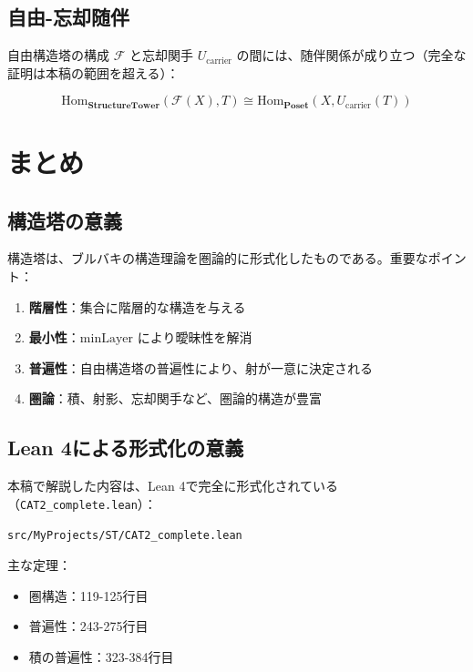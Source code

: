 \documentclass[a4paper,12pt]{ltjsarticle}
\theoremstyle{definition}
\newcommand{\cat}[1]{\mathbf{#1}}
\newcommand{\Hom}{\mathrm{Hom}}
\begin{document}
\subsection{自由-忘却随伴}

自由構造塔の構成 $\mathcal{F}$ と忘却関手 $U_{\mathrm{carrier}}$ の間には、随伴関係が成り立つ（完全な証明は本稿の範囲を超える）：

\[
\Hom_{\cat{StructureTower}}(\mathcal{F}(X), T) \cong \Hom_{\cat{Poset}}(X, U_{\mathrm{carrier}}(T))
\]

\section{まとめ}

\subsection{構造塔の意義}

構造塔は、ブルバキの構造理論を圏論的に形式化したものである。重要なポイント：

\begin{enumerate}
\item \textbf{階層性}：集合に階層的な構造を与える
\item \textbf{最小性}：$\mathrm{minLayer}$ により曖昧性を解消
\item \textbf{普遍性}：自由構造塔の普遍性により、射が一意に決定される
\item \textbf{圏論}：積、射影、忘却関手など、圏論的構造が豊富
\end{enumerate}

\subsection{Lean 4による形式化の意義}

本稿で解説した内容は、Lean 4で完全に形式化されている（\texttt{CAT2\_complete.lean}）：

\begin{tcolorbox}[colback=gray!10, colframe=black, title=Lean 4コードへのリンク]
\texttt{src/MyProjects/ST/CAT2\_complete.lean}

主な定理：
\begin{itemize}
\item 圏構造：119-125行目
\item 普遍性：243-275行目
\item 積の普遍性：323-384行目
\end{itemize}
\end{tcolorbox}
\end{document}
